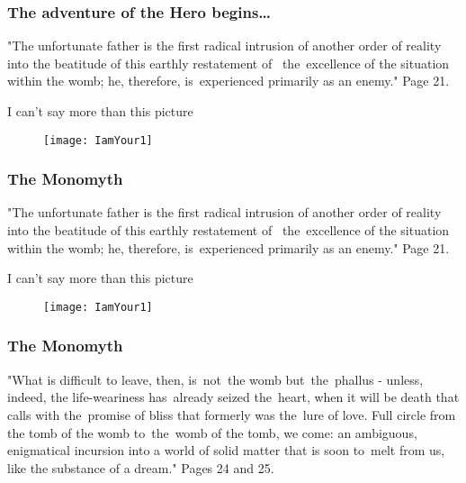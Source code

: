 \documentclass{beamer}  %
\begin{document}
\begin{frame}
  \frametitle{The adventure of the Hero begins\ldots}

  \begin{block}{}
    "The unfortunate father is the first radical intrusion of another
    order of reality into the beatitude of this earthly restatement
    of~ the~excellence of the situation within the womb; he,
    therefore, is~experienced primarily as an enemy." Page 21.
  \end{block}
  \pause

  \begin{block}{I can't say more than this picture}
    \begin{figure}
      \centering \texttt{[image: IamYour1]}
    \end{figure}
  \end{block}

\end{frame}



\begin{frame}
  \frametitle{The Monomyth}

  \begin{block}{}
    "The unfortunate father is the first radical intrusion of another
    order of reality into the beatitude of this earthly restatement
    of~ the~excellence of the situation within the womb; he,
    therefore, is~experienced primarily as an enemy." Page 21.
  \end{block}
  \pause

  \begin{block}{I can't say more than this picture}
    \begin{figure}
      \centering

      \texttt{[image: IamYour1]}
    \end{figure}
  \end{block}

\end{frame}



\begin{frame}
  \frametitle{The Monomyth}

  \begin{block}{}
    "What is difficult to leave, then, is~not~the womb but~the~phallus
    - unless, indeed, the life-weariness has~already seized the~heart,
    when it will be death that calls with the~promise of bliss that
    formerly was the~lure of love. Full circle from the tomb of the
    womb to~the~womb of the tomb, we come: an ambiguous, enigmatical
    incursion into a world of solid matter that is soon to~melt from
    us, like the substance of a dream." Pages 24 and 25.
  \end{block}

\end{frame}
\end{document}

